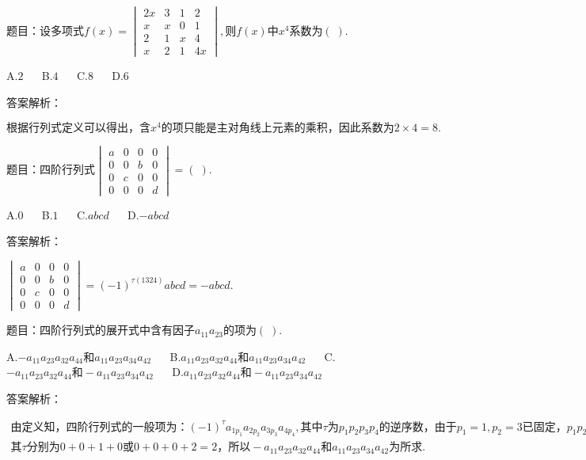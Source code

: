 题目：$\mathrm{设多项式}f(x)=\begin{vmatrix}2x&3&1&2\\x&x&0&1\\2&1&x&4\\x&2&1&4x\end{vmatrix},则f(x)中x^4\mathrm{系数为}(\;).$

A.$2$ $\quad$ B.$4$ $\quad$ C.$8$ $\quad$ D.$6$

答案解析：

$\mathrm{根据行列式定义可以得出}，含x^4\mathrm{的项只能是主对角线上元素的乘积}，\mathrm{因此系数为}2\times4=8.$



题目：$\mathrm{四阶行列式}\begin{vmatrix}a&0&0&0\\0&0&b&0\\0&c&0&0\\0&0&0&d\end{vmatrix}=(\;).$

A.$0$ $\quad$ B.$1$ $\quad$ C.$abcd$ $\quad$ D.$-abcd$

答案解析：

$\begin{vmatrix}a&0&0&0\\0&0&b&0\\0&c&0&0\\0&0&0&d\end{vmatrix}=(-1)^{\tau(1324)}abcd=-abcd.$



题目：$\mathrm{四阶行列式的展开式中含有因子}a_{11}a_{23}\mathrm{的项为}(\;).$

A.$-a_{11}a_{23}a_{32}a_{44}和a_{11}a_{23}a_{34}a_{42}$ $\quad$ B.$a_{11}a_{23}a_{32}a_{44}和a_{11}a_{23}a_{34}a_{42}$ $\quad$ C.$-a_{11}a_{23}a_{32}a_{44}和-a_{11}a_{23}a_{34}a_{42}$ $\quad$ D.$a_{11}a_{23}a_{32}a_{44}和-a_{11}a_{23}a_{34}a_{42}$

答案解析：

$\begin{array}{l}\mathrm{由定义知}，\mathrm{四阶行列式的一般项为}：(-1)^\tau a_{1p_1}a_{2p_2}a_{3p_3}a_{4p_4},\mathrm{其中}\tau 为p_1p_2p_3p_4\mathrm{的逆序数}，\mathrm{由于}p_1=1,p_2=3\mathrm{已固定}，p_1p_2p_3p_4\mathrm{只能形如}13xx,即1324或1342，\\其\tau\mathrm{分别为}0+0+1+0或0+0+0+2=2，\mathrm{所以}-a_{11}a_{23}a_{32}a_{44}和a_{11}a_{23}a_{34}a_{42}\mathrm{为所求}.\\\end{array}$



